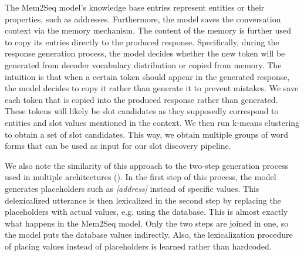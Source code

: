 The Mem2Seq model's knowledge base entries represent entities or their properties, such as addresses.
Furthermore, the model saves the conversation context via the memory mechanism.
The content of the memory is further used to copy its entries directly to the produced response.
Specifically, during the response generation process, the model decides whether the new token will be generated from decoder vocabulary distribution or copied from memory.
The intuition is that when a certain token should appear in the generated response, the model decides to copy it rather than generate it to prevent mistakes.
We save each token that is copied into the produced response rather than generated.
These tokens will likely be slot candidates as they supposedly correspond to entities and slot values mentioned in the context.
We then run k-means clustering to obtain a set of slot candidates.
This way, we obtain multiple groups of word forms that can be used as input for our slot discovery pipeline.

We also note the similarity of this approach to the two-step generation process used in multiple architectures (\cite{lei2018sequicity, peng2021soloist}).
In the first step of this process, the model generates placeholders such as \emph{[address]} instead of specific values.
This delexicalized utterance is then lexicalized in the second step by replacing the placeholders with actual values, e.g. using the database.
This is almost exactly what happens in the Mem2Seq model.
Only the two steps are joined in one, so the model puts the database values indirectly.
Also, the lexicalization procedure of placing values instead of placeholders is learned rather than hardcoded.


